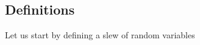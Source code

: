 \newcommand{\lyingIndividual}{{L_j}}
\newcommand{\generatorScoreRV}{{G'_i}}
\newcommand{\lyingGenerator}{{E_i}}
\newcommand{\lyingGeneratorScore}{{E'_i}}
\newcommand{\sortIndex}{g_i}
\newcommand{\generatorScoreRVSorted}{{G'_{\sortIndex}}}
\newcommand{\syndromeRV}{S_j}
\newcommand{\generatorScoreOrderStat}{{G'_{(M - i)}}}
\newcommand{\generatorFlaggedStab}{{G_i}}
\newcommand{\generatorStabNeighbors}{{\aleph_i}}
\newcommand{\overcountGenerator}{\mathcal{O}^G_i}
\newcommand{\overcountError}{\mathcal{O}^E_i}
\newcommand{\PrS}{\half - \half\mleft(1-2p\mright)^\DegStab}
\newcommand{\PrL}{\half + \half \mleft( 1 - 2p\mright)^\DegStab - (1-p)^\DegStab}

\subsection*{Definitions}
Let us start by defining a slew of random variables
